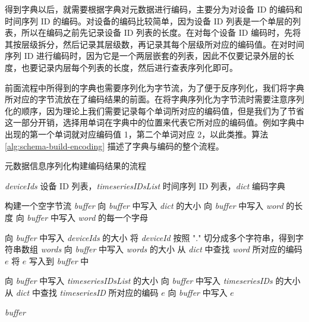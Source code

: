 得到字典以后，就需要根据字典对元数据进行编码，主要分为对设备 ID 的编码和时间序列 ID 的编码。对设备的编码比较简单，因为设备 ID 列表是一个单层的列表，所以在编码之前先记录设备 ID 列表的长度。在对每个设备 ID 编码时，先将其按层级拆分，然后记录其层级数，再记录其每个层级所对应的编码值。在对时间序列 ID 进行编码时，因为它是一个两层嵌套的列表，因此不仅要记录外层的长度，也要记录内层每个列表的长度，然后进行查表序列化即可。

前面流程中所得到的字典也需要序列化为字节流，为了便于反序列化，我们将字典所对应的字节流放在了编码结果的前面。在将字典序列化为字节流时需要注意序列化的顺序，因为理论上我们需要记录每个单词所对应的编码值，但是我们为了节省这一部分开销，选择用单词在字典中的位置来代表它所对应的编码值。例如字典中出现的第一个单词就对应编码值 1，第二个单词对应 2，以此类推。算法 \ref{alg:schema-build-encoding} 描述了字典与编码的整个流程。

\begin{algorithm}
  \caption{元数据信息序列化构建编码结果的流程}
  \label{alg:schema-build-encoding}
  \small
  \begin{algorithmic}
    \REQUIRE \emph{deviceIds} 设备 ID 列表，\emph{timeseriesIDsList} 时间序列 ID 列表，\emph{dict} 编码字典

    \STATE 构建一个空字节流 \emph{buffer}
    \STATE 向 \emph{buffer} 中写入 \emph{dict} 的大小
      \STATE 向 \emph{buffer} 中写入 \emph{word} 的长度
      \STATE 向 \emph{buffer} 中写入 \emph{word} 的每一个字母
    \ENDFOR
    
    \STATE 向 \emph{buffer} 中写入 \emph{deviceIds} 的大小
      \STATE 将 \emph{deviceId} 按照 "." 切分成多个字符串，得到字符串数组 \emph{words}
      \STATE 向 \emph{buffer} 中写入 \emph{words} 的大小
        \STATE 从 \emph{dict} 中查找 \emph{word} 所对应的编码 $e$
        \STATE 将 $e$ 写入到 \emph{buffer} 中
      \ENDFOR
    \ENDFOR

    \STATE 向 \emph{buffer} 中写入 \emph{timeseriesIDsList} 的大小
      \STATE 向 \emph{buffer} 中写入 \emph{timeseriesIDs} 的大小
      \STATE 从 \emph{dict} 中查找 \emph{timeseriesID} 所对应的编码 $e$
      \STATE 向 \emph{buffer} 中写入 $e$
      \ENDFOR
    \ENDFOR

    \RETURN \emph{buffer}


  \end{algorithmic}
\end{algorithm}

